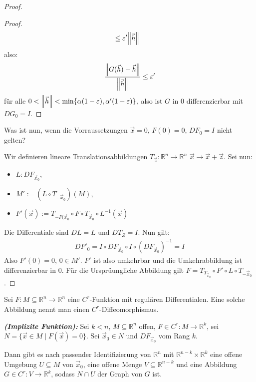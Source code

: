 \documentclass{report}
\renewcommand\epsilon{\varepsilon}
\newcommand*{\newpar}{\par\vspace{\baselineskip}\noindent}
\newcommand{\tbf}[1]{\textbf{#1}}
\newcommand{\bR}{\mathbb{R}}
\newcommand{\vh}{\vec{h}}
\newcommand{\vx}{\vec{x}}
\newcommand{\zz}{\vec{z}}
\begin{document}
\begin{proof}
\begin{proof}
\begin{align*}
                      &\leq \epsilon' \norm{\vh}
 \end{align*}
 also:
 \begin{align*}
  \frac{\norm{G(\vh) - \vh}}{\norm{\vh}} \leq \epsilon'
 \end{align*}
 für alle $0 < \norm{\vh} < \min \{\alpha(1 - \epsilon), \alpha' (1 - \epsilon)\}$, also ist $G$ in $0$ differenzierbar mit $DG_0 = I$.
 \end{proof}
 Was ist nun, wenn die Vorraussetzungen $\vx = 0$, $F(0) = 0$, $DF_0 = I$ nicht gelten?
 \newpar
 Wir definieren lineare Translationsabbildungen $T_{\zz} : \bR^n \to \bR^n$ $\vx \to \vx + \zz$. Sei nun:
 \begin{itemize}
  \item $L : DF_{\vx_0}$,
  \item $M' := (L \circ T_{-\vx_0})(M)$,
  \item $F'(\vx) := T_{-F(\vx_0} \circ F \circ T_{\vx_0} \circ L^{-1}(\vx)$
 \end{itemize}
 Die Differentiale sind $DL = L$ und $DT_Z = I$. Nun gilt:
 \begin{align*}
  DF'_{0} = I \circ DF_{\vx_0} \circ I \circ (DF_{\vx_0})^{-1} = I
 \end{align*}
 Also $F'(0) = 0$, $0 \in M'$. $F'$ ist also umkehrbar und die Umkehrabbildung ist differenzierbar in $0$. Für die Ursprüungliche Abbildung gilt $F = T_{T_{\vx_0}} \circ F' \circ L \circ T_{-\vx_0}$.
\end{proof}
\begin{definition}
 Sei $F : M \subseteq \bR^n \to \bR^n$ eine $C^r$-Funktion mit regulären Differentialen. Eine solche Abbildung nennt man einen $C^r$-Diffeomorphismus.
\end{definition}
\clearpage
[...]
\clearpage
\begin{theorem}
 \emph{\tbf{(Implizite Funktion):}}  Sei $k < n$, $M \subseteq \bR^n$ offen, $F \in C^r : M \to \bR^k$, sei $N = \{\vx \in M \mid F(\vx) = 0\}$. Sei $\vx_0 \in N$ und $DF_{\vx_0}$ vom Rang $k$. 
 
 \noindent Dann gibt es nach passender Identifizierung von $\bR^n$ mit $\bR^{n-k} \times \bR^k$ eine offene Umgebung $U \subseteq M$ von $\vx_0$, eine offene Menge $V \subseteq \bR^{n-k}$ und eine Abbildung $G \in C^r : V \to \bR^k$, sodass $N \cap U$ der Graph von $G$ ist.
\end{theorem}
\end{document}
